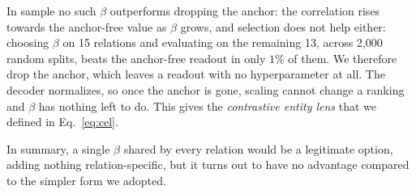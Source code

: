 \documentclass{article}
\begin{document}
In sample
no such $\beta$ outperforms dropping the anchor: the correlation rises
towards the anchor-free value as $\beta$ grows, and selection does not
help either: choosing $\beta$ on 15 relations and evaluating on the
remaining 13, across 2{,}000 random splits, beats the anchor-free readout
in only $1\%$ of them. We therefore drop the anchor, which leaves a
readout with no hyperparameter at all. The decoder normalizes, so once
the anchor is gone, scaling cannot change a ranking and $\beta$ has
nothing left to do. This gives the
\emph{contrastive entity lens} that we defined  in Eq.~\ref{eq:cel}.

In summary, a single
$\beta$ shared by every relation would be a legitimate option, adding
nothing relation-specific, but it turns out to have no
advantage compared to the simpler form we adopted.
\end{document}
